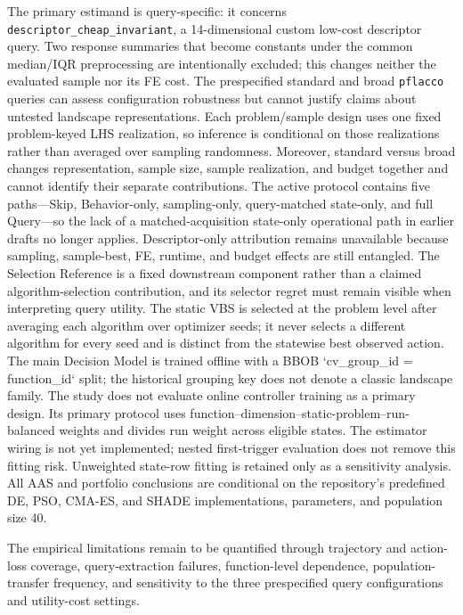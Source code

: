The primary estimand is query-specific: it concerns
\texttt{descriptor\_cheap\_invariant}, a 14-dimensional custom low-cost descriptor query.
Two response summaries that become constants under the common median/IQR
preprocessing are intentionally excluded; this changes neither the evaluated
sample nor its FE cost.
The prespecified standard and broad \texttt{pflacco} queries can assess
configuration robustness but cannot justify claims
about untested landscape representations.  Each problem/sample design uses one
fixed problem-keyed LHS realization, so inference is conditional on those
realizations rather than averaged over sampling randomness.  Moreover,
standard versus broad changes representation, sample size, sample realization,
and budget together and cannot identify their separate contributions.  The active protocol contains five paths—Skip, Behavior-only, sampling-only, query-matched state-only, and full Query—so the lack of a matched-acquisition state-only operational path in earlier drafts no longer applies.  Descriptor-only attribution remains unavailable because sampling, sample-best, FE, runtime, and budget effects are still entangled.  The Selection Reference is a fixed downstream component rather than a claimed algorithm-selection contribution, and its selector regret must remain visible when interpreting query utility.  The static VBS is selected at the problem level after averaging each algorithm over optimizer seeds; it never selects a different algorithm for every seed and is distinct from the statewise best observed action.
The main Decision Model is trained offline with a BBOB `cv_group_id = function_id`
split; the historical grouping key does not denote a classic landscape family.  The
study does not evaluate online controller training as a primary design.  Its
primary protocol uses function--dimension--static-problem--run-balanced weights
and divides run weight across eligible states.  The estimator wiring is not yet
implemented; nested first-trigger evaluation does not remove this fitting risk.
Unweighted state-row fitting is retained only as a sensitivity analysis.
All AAS and portfolio conclusions are conditional on the repository's predefined
DE, PSO, CMA-ES, and SHADE implementations, parameters, and population size 40.

 The empirical limitations remain to be quantified through
trajectory and action-loss coverage, query-extraction failures, function-level
dependence, population-transfer frequency, and sensitivity to the three
prespecified query configurations and utility-cost settings.
